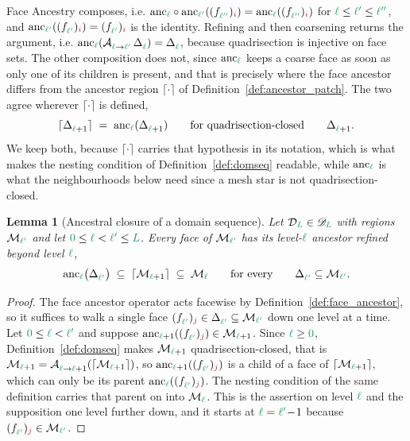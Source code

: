 \documentclass[a4paper, 12pt]{article}
\makeatletter
\newcommand{\green}{\color{ForestGreen}}
\newcommand{\brickred}{\color{BrickRed}}
\DeclareRobustCommand{\simplexsubsetTwo}[2][]{\Delta\ifx\@empty#1\@empty\else^{#1}\fi_{#2}}
\newcommand{\face}[2]{\freeQ{f}{}{#1}{#2}}
\newcommand{\coarseIdxone}{{\brickred i}}
\newcommand{\fineIdxone}{{\brickred j}}
\renewcommand{\l}{{\green\ell}}
\renewcommand{\L}{{\green L}}
\newcommand{\lzero}{{\green 0}}
\newcommand{\lone}{{\green {\l'}  }}
\newcommand{\ltwo}{{\green {\l''} }}
\newcommand{\freeQ}[4]{ ( {#1}^{#2}_{#3} )_{#4}}
\newcommand{\Aop}[3]{\mathcal{A}^{#1}_{{#2} \to {#3}}}
\newcommand{\M}{\mathcal{M}}
\newtheorem{lemma}[theorem]{Lemma}
\theoremstyle{definition}
\theoremstyle{plain}
\numberwithin{equation}{section}
\newcommand{\ancestorPatch}[1]{\lceil #1 \rceil}
\DeclareRobustCommand{\domseq}[1][]{\mathcal{D}\ifx\@empty#1\@empty\else_{#1}\fi}
\newcommand{\alldomseqs}{\mathscr{D}}
\newcommand{\anc}[1]{\mathrm{anc}_{#1}}                     %
\makeatother
\begin{document}
Face Ancestry composes, i.e. $\anc{\l} \circ \anc{\lone} (\face{\ltwo}{\coarseIdxone}) = \anc{\l} (\face{\ltwo}{\coarseIdxone})$ for $\l \leq \lone \leq \ltwo$, and $\anc{\lone}(\face{\lone}{\coarseIdxone}) = \face{\lone}{\coarseIdxone}$ is the identity. Refining and then coarsening returns the argument, i.e. $\anc{\l}(\Aop{}{\l}{\lone} \, \simplexsubsetTwo{\l}) = \simplexsubsetTwo{\l}$, because quadrisection is injective on face sets. The other composition does not, since $\anc{\l}$ keeps a coarse face as soon as only one of its children is present, and that is precisely where the face ancestor differs from the ancestor region $\ancestorPatch{\cdot}$ of Definition~\ref{def:ancestor_patch}. The two agree wherever $\ancestorPatch{\cdot}$ is defined,
\begin{equation}
    \label{eq:ancestor_patch_is_anc}
    \ancestorPatch{\simplexsubsetTwo{\l+1}} \; = \; \anc{\l} ( \simplexsubsetTwo{\l+1} ) \qquad \text{for quadrisection-closed} \qquad \simplexsubsetTwo{\l+1}.
\end{equation}
We keep both, because $\ancestorPatch{\cdot}$ carries that hypothesis in its notation, which is what makes the nesting condition of Definition~\ref{def:domseq} readable, while $\anc{\l}$ is what the neighbourhoods below need since a mesh star is not quadrisection-closed.

\begin{lemma}[Ancestral closure of a domain sequence]
    \label{lemma:ancestral_closure}
    Let $\domseq[\L] \in \alldomseqs_\L$ with regions $\M_\lone$ and let $\lzero \leq \l < \lone \leq \L$. Every face of $\M_\lone$ has its level-$\l$ ancestor refined beyond level $\l$,
    \begin{equation}
        \label{eq:ancestral_closure}
        \anc{\l} \big( \simplexsubsetTwo{\lone} \big) \; \subseteq \; \ancestorPatch{\M_{\l+1}} \; \subseteq \; \M_\l \qquad \text{for every} \qquad \simplexsubsetTwo{\lone} \subseteq \M_\lone.
    \end{equation}
\end{lemma}
\begin{proof}
    The face ancestor operator acts facewise by Definition~\ref{def:face_ancestor}, so it suffices to walk a single face $\face{\lone}{\fineIdxone} \in \simplexsubsetTwo{\lone} \subseteq \M_\lone$ down one level at a time. Let $\lzero \leq \l < \lone$ and suppose $\anc{\l+1}(\face{\lone}{\fineIdxone}) \in \M_{\l+1}$. Since $\l \geq \lzero$, Definition~\ref{def:domseq} makes $\M_{\l+1}$ quadrisection-closed, that is $\M_{\l+1} = \Aop{}{\l}{\l+1}(\ancestorPatch{\M_{\l+1}})$, so $\anc{\l+1}(\face{\lone}{\fineIdxone})$ is a child of a face of $\ancestorPatch{\M_{\l+1}}$, which can only be its parent $\anc{\l}(\face{\lone}{\fineIdxone})$. The nesting condition of the same definition carries that parent on into $\M_\l$. This is the assertion on level $\l$ and the supposition one level further down, and it starts at $\l = \lone \! - \! 1$ because $\face{\lone}{\fineIdxone} \in \M_\lone$.
\end{proof}
\end{document}
